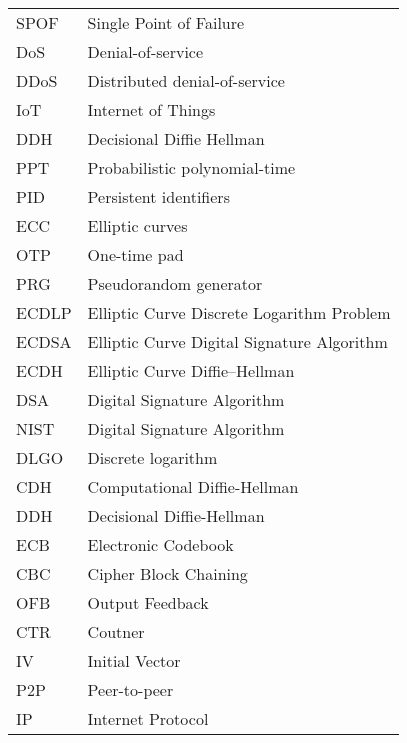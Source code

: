 \begin{center}
\begin{longtable}{ l @{\qquad} l }
	SPOF    & Single Point of Failure \\
	DoS    & Denial-of-service \\
	DDoS    & Distributed denial-of-service \\
	IoT    & Internet of Things \\
	DDH    & Decisional Diffie Hellman \\
	PPT    & Probabilistic polynomial-time \\
	PID    & Persistent identifiers \\
	ECC    & Elliptic curves \\
	OTP    & One-time pad\\
	PRG    & Pseudorandom generator\\
	ECDLP    & Elliptic Curve Discrete Logarithm Problem\\
	ECDSA    & Elliptic Curve Digital Signature Algorithm\\
	ECDH    & Elliptic Curve Diffie–Hellman\\
	DSA    & Digital Signature Algorithm\\
	NIST    & Digital Signature Algorithm\\
	DLGO    & Discrete logarithm\\
	CDH    & Computational Diffie-Hellman\\
	DDH    & Decisional Diffie-Hellman\\
	ECB    & Electronic Codebook\\
	CBC    & Cipher Block Chaining\\
	OFB    & Output Feedback\\
	CTR    & Coutner\\
	IV    & Initial Vector\\
	P2P    & Peer-to-peer\\
	IP    & Internet Protocol\\
	\bottomrule
	\end{longtable}
\end{center}
